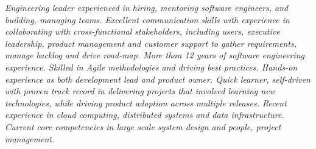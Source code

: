{\selectfont
\begin{justify}\textit{Engineering leader experienced in hiring, mentoring software engineers, and building, managing teams. Excellent communication skills with experience in collaborating with cross-functional stakeholders, including users, executive leadership, product management and customer support to gather requirements, manage backlog and drive road-map. More than 12 years of software engineering experience. Skilled in Agile methodologies and driving best practices. Hands-on experience as both development lead and product owner. Quick learner, self-driven with proven track record in delivering projects that involved learning new technologies, while driving product adoption across multiple releases. Recent experience in cloud computing, distributed systems and data infrastructure. Current core competencies in large scale system design and people, project management.}\end{justify}
}